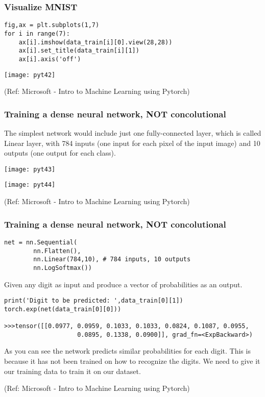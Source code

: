 \begin{frame}[fragile] \frametitle{Visualize MNIST}


\begin{lstlisting}
fig,ax = plt.subplots(1,7)
for i in range(7):
    ax[i].imshow(data_train[i][0].view(28,28))
    ax[i].set_title(data_train[i][1])
    ax[i].axis('off')
\end{lstlisting}

\begin{center}
\texttt{[image: pyt42]}
\end{center}


\tiny{(Ref: Microsoft - Intro to Machine Learning using Pytorch)}
\end{frame}


\begin{frame}[fragile] \frametitle{Training a dense neural network, NOT concolutional}

The simplest network would include just one fully-connected layer, which is called Linear layer, with 784 inputs (one input for each pixel of the input image) and 10 outputs (one output for each class).

\begin{center}
\texttt{[image: pyt43]}

\texttt{[image: pyt44]}

\end{center}


\tiny{(Ref: Microsoft - Intro to Machine Learning using Pytorch)}
\end{frame}

\begin{frame}[fragile] \frametitle{Training a dense neural network, NOT concolutional}

\begin{lstlisting}
net = nn.Sequential(
        nn.Flatten(), 
        nn.Linear(784,10), # 784 inputs, 10 outputs
        nn.LogSoftmax())
\end{lstlisting}

Given any digit as input and produce a vector of probabilities as an output.


\begin{lstlisting}
print('Digit to be predicted: ',data_train[0][1])
torch.exp(net(data_train[0][0]))

>>>tensor([[0.0977, 0.0959, 0.1033, 0.1033, 0.0824, 0.1087, 0.0955, 
					0.0895, 0.1338, 0.0900]], grad_fn=<ExpBackward>)
\end{lstlisting}

As you can see the network predicts similar probabilities for each digit. This is because it has not been trained on how to recognize the digits. We need to give it our training data to train it on our dataset.

\tiny{(Ref: Microsoft - Intro to Machine Learning using Pytorch)}
\end{frame}


